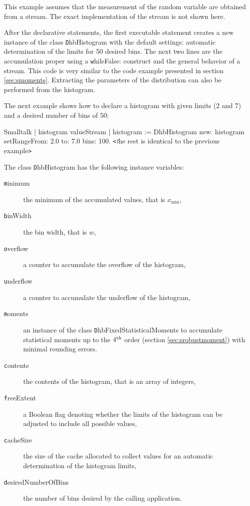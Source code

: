 This example assumes that the measurement of the random variable
are obtained from a stream. The exact implementation of the stream
is not shown here.

After the declarative statements, the first executable statement
creates a new instance of the class {\texttt DhbHistogram} with the
default settings: automatic determination of the limits for 50
desired bins. The next two lines are the accumulation proper using
a {\texttt whileFalse:} construct and the general behavior of a
stream. This code is very similar to the code example presented in
section \ref{sec:smoments}. Extracting the parameters of the
distribution can also be performed from the histogram.

\noindent The next example shows how to declare a histogram with
given limits (2 and 7) and a desired number of bins of 50:
\begin{displaycode}{Smalltalk}
 | histogram valueStream |
 histogram := DhbHistogram new.
 histogram setRangeFrom: 2.0 to: 7.0 bins: 100.
\hfil {\texttt<\textsl the rest is identical to the previous example\texttt
>}\hfil
\end{displaycode}

\noindent The class {\texttt DhbHistogram} has the following instance
variables:
\begin{description}
  \item[\texttt minimum] the minimum of the accumulated values, that
  is $x_{\min}$,
  \item[\texttt binWidth] the bin width, that is $w$,
  \item[\texttt overflow] a counter to accumulate the overflow of the histogram,
  \item[\texttt underflow] a counter to accumulate the underflow of the histogram,
  \item[\texttt moments] an instance of the class {\texttt
  DhbFixedStatisticalMoments} to accumulate statistical moments up
  to the $4^{\mathop{\textrm{th}}}$ order (\cf section \ref{sec:srobustmoment}) with
  minimal rounding errors.
  \item[\texttt contents] the contents of the histogram, that is an
  array of integers,
  \item[\texttt freeExtent] a Boolean flag denoting whether the limits
  of the histogram can be adjusted to include all possible values,
  \item[\texttt cacheSize] the size of the cache allocated to collect
  values for an automatic determination of the histogram limits,
  \item[\texttt desiredNumberOfBins] the number of bins desired by the
  calling application.
\end{description}

